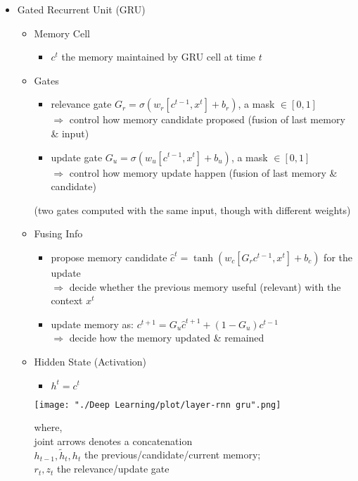 \begin{itemize}
\item Gated Recurrent Unit (GRU)
	\begin{itemize}
	\item Memory Cell
		\begin{itemize}
		\item $c^t$ the memory maintained by GRU cell at time $t$
		\end{itemize}
	\item Gates
		\begin{itemize}
		\item relevance gate $G_r=\sigma(w_r[c^{t-1}, x^t]+b_r)$, a mask $\in [0,1]$ \\ 
		$\Rightarrow$ control how memory candidate proposed (fusion of last memory \& input)
		\item update gate $G_u=\sigma(w_u[c^{t-1}, x^t]+b_u)$, a mask $\in [0,1]$ \\
		$\Rightarrow$ control how memory update happen (fusion of last memory \& candidate)
		\end{itemize}
		(two gates computed with the same input, though with different weights)
	\item Fusing Info
		\begin{itemize}
		\item propose memory candidate $\hat{c}^{t}=\tanh(w_c[G_r c^{t-1}, x^{t}]+b_c)$ for the update \\
		$\Rightarrow$ decide whether the previous memory useful (relevant) with the context $x^t$
		\item update memory as: $c^{t+1}=G_u \hat{c}^{t+1} + (1-G_u)c^{t-1}$ \\ 
		$\Rightarrow$ decide how the memory updated \& remained
		\end{itemize}
	\item Hidden State (Activation)
		\begin{itemize}
		\item $h^t = c^t$
		\end{itemize}
		
	\begin{minipage}[r]{0.5\linewidth}
	\texttt{[image: "./Deep Learning/plot/layer-rnn gru".png]}
	\end{minipage}
	\begin{minipage}[l]{\linewidth}
	where, \\ 
	joint arrows denotes a concatenation \\ 
	$h_{t-1}, \widetilde h_t, h_t$ the previous/candidate/current memory; \\ 
	$r_t, z_t$ the relevance/update gate
	\end{minipage}
	

\end{itemize}
\end{itemize}
